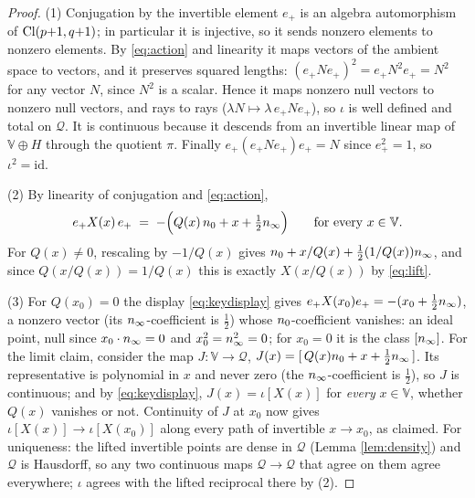 \begin{proof}
(1) Conjugation by the invertible element $e_+$ is an algebra automorphism of $\mathrm{Cl}(p{+}1,q{+}1)$; in particular it is injective, so it sends nonzero elements to nonzero elements. By \eqref{eq:action} and linearity it maps vectors of the ambient space to vectors, and it preserves squared lengths: $(e_+ N e_+)^2 = e_+ N^2 e_+ = N^2$ for any vector $N$, since $N^2$ is a scalar. Hence it maps nonzero null vectors to nonzero null vectors, and rays to rays ($\lambda N \mapsto \lambda\, e_+Ne_+$), so $\iota$ is well defined and total on $\mathcal{Q}$. It is continuous because it descends from an invertible linear map of $\mathbb{V} \oplus H$ through the quotient $\pi$. Finally $e_+ (e_+ N e_+) e_+ = N$ since $e_+^2 = 1$, so $\iota^2 = \mathrm{id}$.

(2) By linearity of conjugation and \eqref{eq:action},
\begin{equation}\label{eq:keydisplay}
e_+ X(x)\, e_+ \;=\; -\Bigl( Q(x)\,n_0 + x + \tfrac12 n_\infty \Bigr) \qquad \text{for every } x \in \mathbb{V}.
\end{equation}
For $Q(x) \neq 0$, rescaling by $-1/Q(x)$ gives $n_0 + x/Q(x) + \tfrac12 (1/Q(x)) n_\infty$, and since $Q(x/Q(x)) = 1/Q(x)$ this is exactly $X(x/Q(x))$ by \eqref{eq:lift}.

(3) For $Q(x_0) = 0$ the display \eqref{eq:keydisplay} gives $e_+ X(x_0) e_+ = -(x_0 + \tfrac12 n_\infty)$, a nonzero vector (its $n_\infty$-coefficient is $\tfrac12$) whose $n_0$-coefficient vanishes: an ideal point, null since $x_0 \cdot n_\infty = 0$ and $x_0^2 = n_\infty^2 = 0$; for $x_0 = 0$ it is the class $[n_\infty]$. For the limit claim, consider the map $J : \mathbb{V} \to \mathcal{Q}$, $J(x) = [\,Q(x)n_0 + x + \tfrac12n_\infty\,]$. Its representative is polynomial in $x$ and never zero (the $n_\infty$-coefficient is $\tfrac12$), so $J$ is continuous; and by \eqref{eq:keydisplay}, $J(x) = \iota[X(x)]$ for \emph{every} $x \in \mathbb{V}$, whether $Q(x)$ vanishes or not. Continuity of $J$ at $x_0$ now gives $\iota[X(x)] \to \iota[X(x_0)]$ along every path of invertible $x \to x_0$, as claimed. For uniqueness: the lifted invertible points are dense in $\mathcal{Q}$ (Lemma \ref{lem:density}) and $\mathcal{Q}$ is Hausdorff, so any two continuous maps $\mathcal{Q} \to \mathcal{Q}$ that agree on them agree everywhere; $\iota$ agrees with the lifted reciprocal there by (2).
\end{proof}

